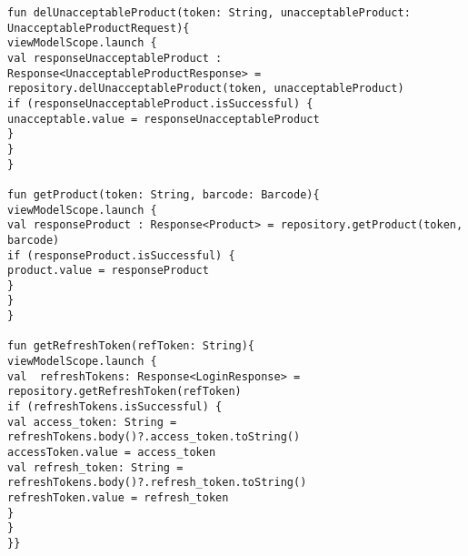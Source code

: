 \clearpage
{}
\begin{lstlisting}
fun delUnacceptableProduct(token: String, unacceptableProduct: UnacceptableProductRequest){
viewModelScope.launch {
val responseUnacceptableProduct : Response<UnacceptableProductResponse> = repository.delUnacceptableProduct(token, unacceptableProduct)
if (responseUnacceptableProduct.isSuccessful) {
unacceptable.value = responseUnacceptableProduct
}
}
}

fun getProduct(token: String, barcode: Barcode){
viewModelScope.launch {
val responseProduct : Response<Product> = repository.getProduct(token, barcode)
if (responseProduct.isSuccessful) {
product.value = responseProduct
}
}
}

fun getRefreshToken(refToken: String){
viewModelScope.launch {
val  refreshTokens: Response<LoginResponse> = repository.getRefreshToken(refToken)
if (refreshTokens.isSuccessful) {
val access_token: String = refreshTokens.body()?.access_token.toString()
accessToken.value = access_token
val refresh_token: String = refreshTokens.body()?.refresh_token.toString()
refreshToken.value = refresh_token
}
}
}}

\end{lstlisting}
\clearpage